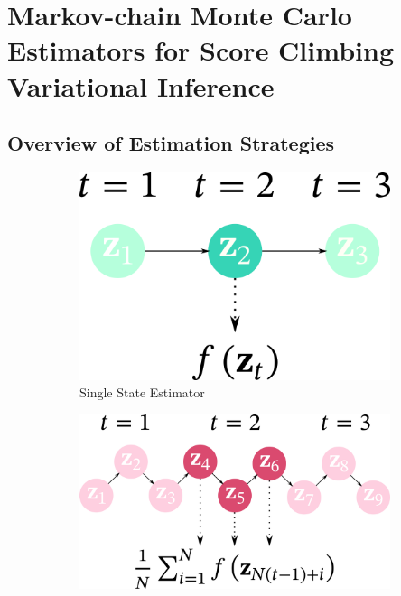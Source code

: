 
\section{Markov-chain Monte Carlo Estimators for Score Climbing Variational Inference}
\vspace{-0.05in}
\subsection{Overview of Estimation Strategies}\label{section:jsa_msc}
%
\vspace{-0.05in}

\begin{figure}
    \centering
    \begin{subfigure}[b]{0.25\textwidth}
        \centering
        \includegraphics[scale=0.25]{figures/diagram_1.png}
        \caption{Single State Estimator}\label{fig:single}
    \end{subfigure}
    \begin{subfigure}[b]{0.35\textwidth}
        \centering
        \includegraphics[scale=0.25]{figures/diagram_2.png}

\end{subfigure}
\end{figure}
